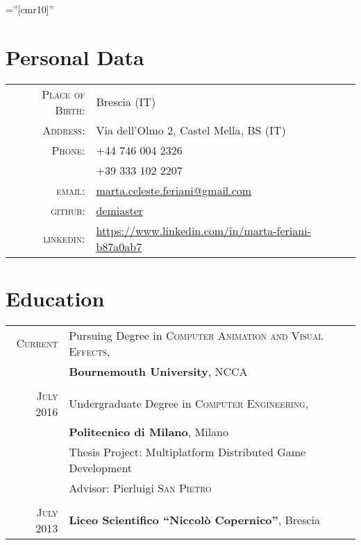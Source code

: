 \documentclass[a4paper,10pt]{article} %
\begin{document}
\pagestyle{empty} %

\font\fb=''[cmr10]'' %


\par{\bigskip\par} %

\section{Personal Data}

\begin{tabular}{rl}
\textsc{Place of Birth:} & Brescia (IT) \\
\textsc{Address:} & Via dell'Olmo 2, Castel Mella, BS (IT) \\
\textsc{Phone:} & +44 746 004 2326 \\& +39 333 102 2207\\
\textsc{email:} & \href{mailto:marta.celeste.feriani@gmail.com}{marta.celeste.feriani@gmail.com}\\
\textsc{github:} & \href{https://github.com/demiaster}{demiaster}\\
\textsc{linkedin:} & \href{https://www.linkedin.com/in/marta-feriani-b87a0ab7}{https://www.linkedin.com/in/marta-feriani-b87a0ab7}
\end{tabular}



\section{Education}

\begin{tabular}{rl}
\textsc{Current} & Pursuing Degree in \textsc{Computer Animation and Visual Effects}, \\
& \textbf{Bournemouth University}, NCCA\\
&\\


\textsc{July} 2016& Undergraduate Degree in \textsc{}\textsc{Computer Engineering}, \\
& \normalsize\textbf{Politecnico di Milano}, Milano\\
& Thesis Project: Multiplatform Distributed Game Development\\
& \small Advisor: Pierluigi \textsc{San Pietro}\\
&\\


\textsc{July} 2013& \textbf{Liceo Scientifico ``Niccolò Copernico''}, Brescia
\end{tabular}
\end{document}
